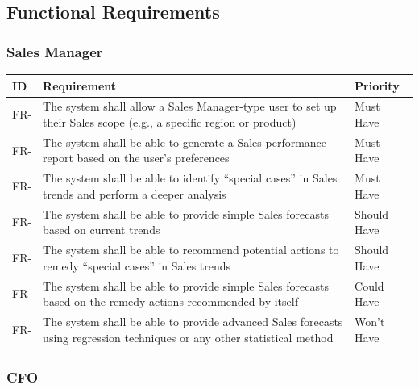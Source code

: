 \documentclass[a4paper]{report}
\begin{document}

\newcommand{\frid}{FR-\arabic{frcounter}}
\newcommand{\nfrid}{NFR-\arabic{nfrcounter}}

\subsection{Functional Requirements}

\subsubsection{Sales Manager}

\begin{tabular}{|l|p{10cm}|l|}
\hline
\textbf{ID} & \textbf{Requirement} & \textbf{Priority} \\
\hline
\stepcounter{frcounter}\frid & The system shall allow a Sales Manager-type user to set up their Sales scope (e.g., a specific region or product) & Must Have \\ \hline
\stepcounter{frcounter}\frid & The system shall be able to generate a Sales performance report based on the user’s preferences & Must Have \\ \hline
\stepcounter{frcounter}\frid & The system shall be able to identify “special cases” in Sales trends and perform a deeper analysis & Must Have \\ \hline
\stepcounter{frcounter}\frid & The system shall be able to provide simple Sales forecasts based on current trends & Should Have \\ \hline
\stepcounter{frcounter}\frid & The system shall be able to recommend potential actions to remedy “special cases” in Sales trends & Should Have \\ \hline
\stepcounter{frcounter}\frid & The system shall be able to provide simple Sales forecasts based on the remedy actions recommended by itself & Could Have \\ \hline
\stepcounter{frcounter}\frid & The system shall be able to provide advanced Sales forecasts using regression techniques or any other statistical method & Won’t Have \\
\hline
\end{tabular}

\subsubsection{CFO}
\end{document}
